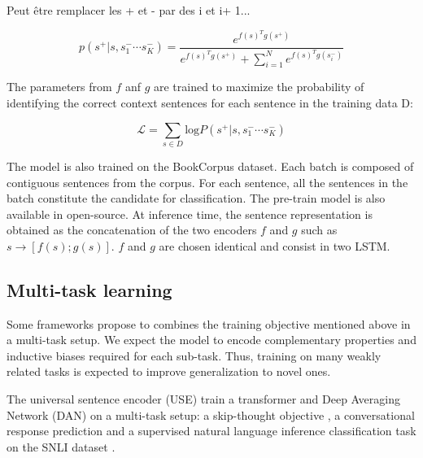 Peut être remplacer les + et - par des i et i+ 1...

\begin{equation*}
    p(s^+ | s, s^-_1 \cdots s^-_K) = \frac{e^{f(s)^Tg(s^+)}}{e^{f(s)^Tg(s^+)}+\sum_{i=1}^Ne^{f(s)^Tg(s^-_i)}}    
\end{equation*}

The parameters from $f$ anf $g$ are trained to maximize the probability of identifying the correct context sentences for
each sentence in the training data D:

\begin{equation*}
    \mathcal{L} = \sum_{s \in D} \text{log} P(s^+ | s, s^-_1 \cdots s^-_K)
\end{equation*}


The model is also trained on the BookCorpus dataset. Each batch is composed of contiguous sentences from the corpus. For each sentence, all the sentences in the batch constitute the candidate for classification. The pre-train model is also available in open-source. At inference time, the sentence representation is obtained as the concatenation of the two encoders $f$ and $g$ such as $s \rightarrow [f(s);g(s)]$. $f$ and $g$ are chosen identical and consist in two LSTM. 


\subsection{Multi-task learning}

Some frameworks propose to combines the training objective mentioned above in a multi-task setup. We expect the model to encode complementary properties and inductive biases required for each sub-task. Thus, training on many weakly related tasks is expected to improve generalization to novel ones.

The universal sentence encoder (USE) \parencite{cer_18} train a transformer and Deep Averaging Network (DAN) on a multi-task setup: a skip-thought objective \parencite{kiros_15}, a conversational response prediction and a supervised natural language inference classification task on the SNLI dataset \parencite{bowman_15, conneau_17}.

